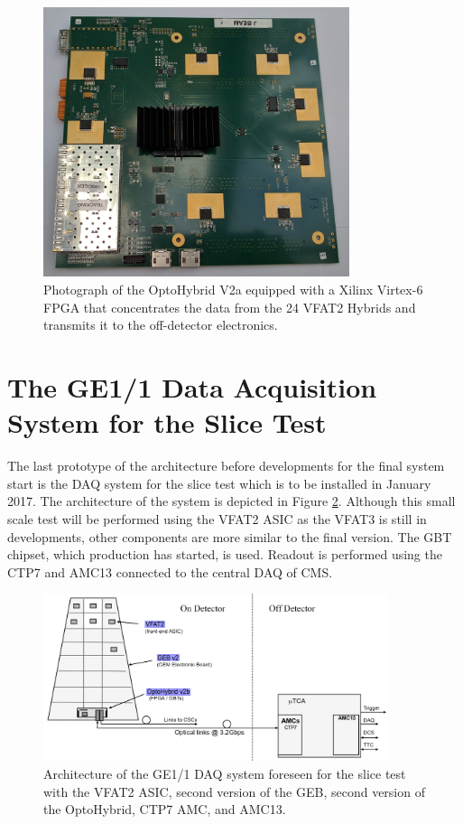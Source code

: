       \begin{figure}[h!]
        \centering
        \includegraphics[width=0.8\textwidth]{img/II-2-daq/oh-v2a.jpg}
        \caption{Photograph of the OptoHybrid V2a equipped with a Xilinx Virtex-6 FPGA that concentrates the data from the 24 VFAT2 Hybrids and transmits it to the off-detector electronics.}
        \label{fig:II-2-ohv2a}
      \end{figure}

  \section{The GE1/1 Data Acquisition System for the Slice Test}

    The last prototype of the architecture before developments for the final system start is the DAQ system for the slice test which is to be installed in January 2017. The architecture of the system is depicted in Figure \ref{fig:II-2-gem-system-v2b}. Although this small scale test will be performed using the VFAT2 ASIC as the VFAT3 is still in developments, other components are more similar to the final version. The GBT chipset, which production has started, is used. Readout is performed using the CTP7 and AMC13 connected to the central DAQ of CMS.

    \begin{figure}[h!]
      \centering
      \includegraphics[width=0.9\textwidth]{img/II-2-daq/gem-system-v2b.pdf}
      \caption{Architecture of the GE1/1 DAQ system foreseen for the slice test with the VFAT2 ASIC, second version of the GEB, second version of the OptoHybrid, CTP7 AMC, and AMC13.}
      \label{fig:II-2-gem-system-v2b}
    \end{figure}

